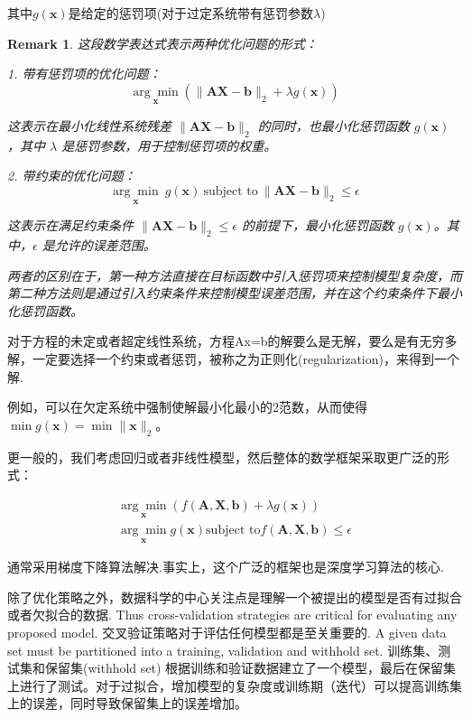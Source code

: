\documentclass{ctexart}
\newtheorem*{remark}{Remark}
\begin{document}
其中$g(\mathbf{x})$是给定的惩罚项(对于过定系统带有惩罚参数$\lambda$)

\begin{remark}


    这段数学表达式表示两种优化问题的形式：

    1. 带有惩罚项的优化问题：
    \[ \underset{\mathbf{x}}{\arg\min} \left( \| \mathbf{AX} - \mathbf{b} \|_2 + \lambda g(\mathbf{x}) \right) \]
    
    这表示在最小化线性系统残差 \(\| \mathbf{AX} - \mathbf{b} \|_2\) 的同时，也最小化惩罚函数 \(g(\mathbf{x})\)，其中 \(\lambda\) 是惩罚参数，用于控制惩罚项的权重。
    
    2. 带约束的优化问题：
    \[ \underset{\mathbf{x}}{\arg\min} \ g(\mathbf{x}) \ \text{subject to} \ \| \mathbf{AX} - \mathbf{b} \|_2 \leq \epsilon \]
    
    这表示在满足约束条件 \(\| \mathbf{AX} - \mathbf{b} \|_2 \leq \epsilon\) 的前提下，最小化惩罚函数 \(g(\mathbf{x})\)。其中，\(\epsilon\) 是允许的误差范围。
    
    两者的区别在于，第一种方法直接在目标函数中引入惩罚项来控制模型复杂度，而第二种方法则是通过引入约束条件来控制模型误差范围，并在这个约束条件下最小化惩罚函数。
\end{remark}


\vspace{10ex} %

对于方程的未定或者超定线性系统，方程Ax=b的解要么是无解，要么是有无穷多解，一定要选择一个约束或者惩罚，被称之为正则化(regularization)，来得到一个解.

例如，可以在欠定系统中强制使解最小化最小的2范数，从而使得 \(\min g(\mathbf{x}) = \min \| \mathbf{x} \|_2\)。

更一般的，我们考虑回归或者非线性模型，然后整体的数学框架采取更广泛的形式：

\begin{align}
    \underset{\mathbf{x}}{\arg\min} (f(\mathbf{ A,X,b}) + \lambda g(\mathbf{x})) \\
    \underset{\mathbf{x}}{\arg\min} g(\mathbf{x}) \text{subject to} 
    f(\mathbf{ A,X,b}) \leq \epsilon
\end{align}

通常采用梯度下降算法解决.事实上，这个广泛的框架也是深度学习算法的核心.

除了优化策略之外，数据科学的中心关注点是理解一个被提出的模型是否有过拟合或者欠拟合的数据.
Thus cross-validation strategies are
critical for evaluating any proposed model.
交叉验证策略对于评估任何模型都是至关重要的.
A given data set
must be partitioned into a training, validation and withhold set.
训练集、测试集和保留集(withhold set)
根据训练和验证数据建立了一个模型，最后在保留集上进行了测试。对于过拟合，增加模型的复杂度或训练期（迭代）可以提高训练集上的误差，同时导致保留集上的误差增加。
\end{document}
